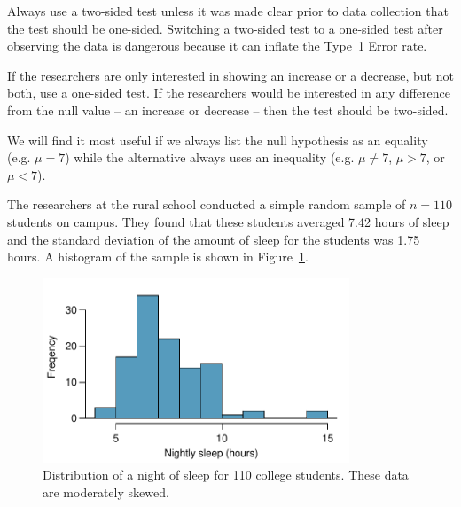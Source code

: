 Always use a two-sided test unless it was made clear prior to data collection that the test should be one-sided. Switching a two-sided test to a one-sided test after observing the data is dangerous because it can inflate the Type~1 Error rate. 

\begin{tipBox}{
If the researchers are only interested in showing an increase or a decrease, but not both, use a one-sided test. If the researchers would be interested in any difference from the null value -- an increase or decrease -- then the test should be two-sided.\vspace{0.5mm}}
\end{tipBox}

\begin{tipBox}{
We will find it most useful if we always list the null hypothesis as an equality (e.g. $\mu = 7$) while the alternative always uses an inequality (e.g. $\mu\neq7$, $\mu>7$, or $\mu<7$).}
\end{tipBox}

The researchers at the rural school conducted a simple random sample of $n=110$ students on campus. They found that these students averaged 7.42 hours of sleep and the standard deviation of the amount of sleep for the students was 1.75 hours. A histogram of the sample is shown in Figure~\ref{histOfSleepForCollegeThatWasCheckingForMoreThan7Hours}.

\begin{figure}
\centering
\includegraphics[height=55mm]{04/figures/histOfSleepForCollegeThatWasCheckingForMoreThan7Hours/histOfSleepForCollegeThatWasCheckingForMoreThan7Hours}
\caption{Distribution of a night of sleep for 110 college students. These data are moderately skewed.}
\label{histOfSleepForCollegeThatWasCheckingForMoreThan7Hours}
\end{figure}

